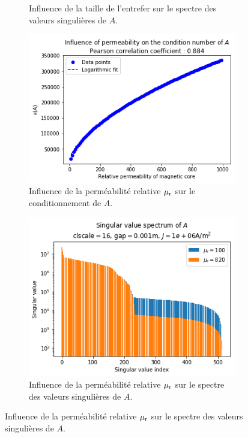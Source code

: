 \documentclass[11pt]{article}
\begin{document}
\begin{figure}[H]
\begin{subfigure}{0.24\textwidth}
		\caption{Influence de la taille de l'entrefer sur le spectre des valeurs singulières de $A$.}
		\label{fig:gapspec}
	\end{subfigure}\hfill
	\begin{subfigure}{0.24\textwidth}
		\centering
		\includegraphics[width=\linewidth]{mucond.png}
		\caption{Influence de la perméabilité relative $\mu_{\textnormal{r}}$ sur le conditionnement de $A$.}
		\label{fig:mucond}
	\end{subfigure}\hfill
	\begin{subfigure}{0.24\textwidth}
		\centering
		\includegraphics[width=\linewidth]{muspec.png}
		\caption{Influence de la perméabilité relative $\mu_{\textnormal{r}}$ sur le spectre des valeurs singulières de $A$.}

\end{subfigure}
\end{figure}
\end{document}
